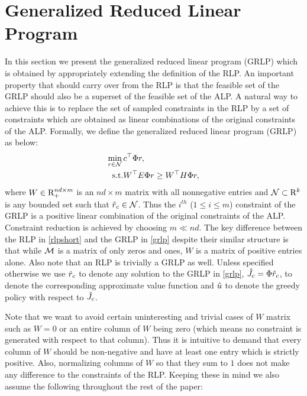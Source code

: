 \section{Generalized Reduced Linear Program}
In this section we present the generalized reduced linear program (GRLP) which is obtained by appropriately extending the definition of the RLP. An important property that should carry over from the RLP is that the feasible set of the GRLP should also be a superset of the feasible set of the ALP. A natural way to achieve this is to replace the set of sampled constraints in the RLP by a set of constraints which are obtained as linear combinations of the original constraints of the ALP. Formally, we define the generalized reduced linear program (GRLP) as below:
\begin{align}\label{grlp}
\begin{split}
\underset{r\in \N}{\min}\, &c^\top \Phi r,\\
\text{s.t.}\mb & W^\top E\Phi r\geq W^\top H \Phi r, 
\end{split}
\end{align}
where $W \in \mathrm{R}_+^{nd\times m}$ is an $nd\times m$ matrix with all nonnegative entries and $\mathcal{N} \subset \mathrm{R}^k$ is any bounded set such that $\tilde{r}_c \in \mathcal{N}$. 
Thus the $i^{th}$ ($1\leq i\leq m$) constraint of the GRLP is a positive linear combination of the original constraints of the ALP. Constraint reduction is achieved by choosing $m\ll nd$. The key difference between the RLP in \eqref{rlpshort} and the GRLP in \eqref{grlp} despite their similar structure is that while $\mathcal{M}$ is a matrix of only zeros and ones, $W$ is a matrix of positive entries alone. Also note that an RLP is trivially a GRLP as well. Unless specified otherwise we use $\hat{r}_c$ to denote any solution to the GRLP in \eqref{grlp}, $\hat{J}_c=\Phi \hat{r}_c$, to denote the corresponding approximate value function and $\hat{u}$ to denote the greedy policy with respect to $\hat{J}_c$.\par
Note that we want to avoid certain uninteresting and trivial cases of $W$ matrix such as $W=0$ or an entire column of $W$ being zero (which means no constraint is generated with respect to that column). Thus it is intuitive to demand that every column of $W$ should be non-negative and have at least one entry which is strictly positive. Also, normalizing columns of $W$ so that they sum to $1$ does not make any difference to the constraints of the RLP. Keeping these in mind we also assume the following throughout the rest of the paper:

